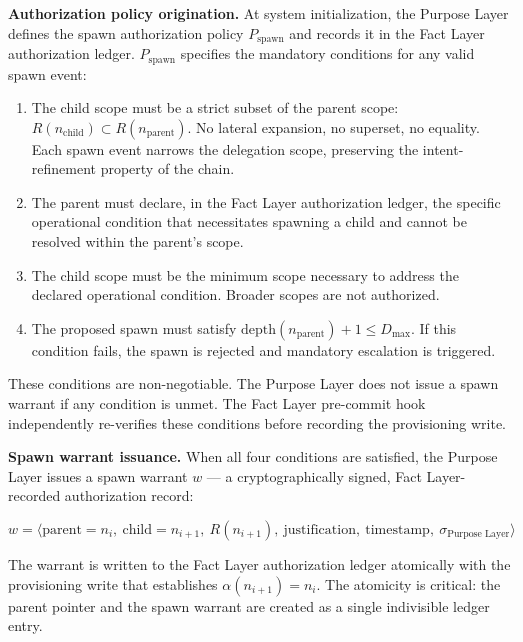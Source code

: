\medskip
\noindent\textbf{Authorization policy origination.} At system initialization, the Purpose Layer defines the spawn authorization policy $P_{\text{spawn}}$ and records it in the Fact Layer authorization ledger. $P_{\text{spawn}}$ specifies the mandatory conditions for any valid spawn event:

\begin{enumerate}
    \item[(S1) \textbf{Scope refinement.}] The child scope must be a strict subset of the parent scope: $R(n_{\text{child}}) \subset R(n_{\text{parent}})$. No lateral expansion, no superset, no equality. Each spawn event narrows the delegation scope, preserving the intent-refinement property of the chain.
    \item[(S2) \textbf{Operational necessity.}] The parent must declare, in the Fact Layer authorization ledger, the specific operational condition that necessitates spawning a child and cannot be resolved within the parent's scope.
    \item[(S3) \textbf{Minimum scope proportionality.}] The child scope must be the minimum scope necessary to address the declared operational condition. Broader scopes are not authorized.
    \item[(S4) \textbf{Depth bound compliance.}] The proposed spawn must satisfy $\text{depth}(n_{\text{parent}}) + 1 \leq D_{\max}$. If this condition fails, the spawn is rejected and mandatory escalation is triggered.
\end{enumerate}

These conditions are non-negotiable. The Purpose Layer does not issue a spawn warrant if any condition is unmet. The Fact Layer pre-commit hook independently re-verifies these conditions before recording the provisioning write.

\medskip
\noindent\textbf{Spawn warrant issuance.} When all four conditions are satisfied, the Purpose Layer issues a spawn warrant $w$ --- a cryptographically signed, Fact Layer-recorded authorization record:

\begin{equation}
w = \bigl\langle \text{parent}=n_i,\ \text{child}=n_{i+1},\ R(n_{i+1}),\ \text{justification},\ \text{timestamp},\ \sigma_{\text{Purpose Layer}} \bigr\rangle
\label{eq:spawn-warrant-structure}
\end{equation}

The warrant is written to the Fact Layer authorization ledger atomically with the provisioning write that establishes $\alpha(n_{i+1}) = n_i$. The atomicity is critical: the parent pointer and the spawn warrant are created as a single indivisible ledger entry.

